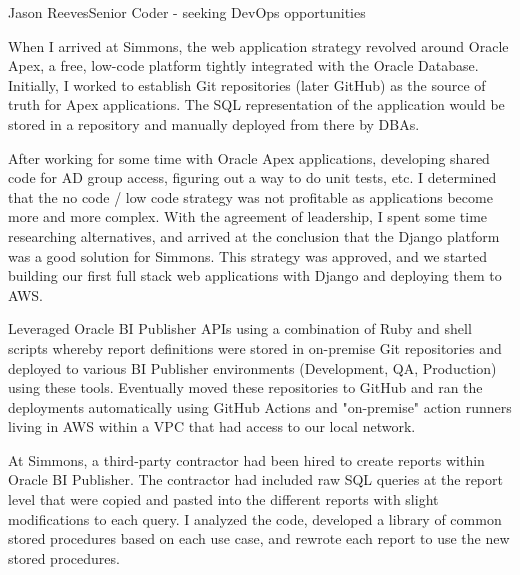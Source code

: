 \documentclass{article}
\begin{document}
\begin{cv}[avatar]{Jason Reeves}{Senior Coder - seeking DevOps opportunities}
\begin{cvevent}[2019]
    When I arrived at Simmons, the web application strategy revolved around Oracle Apex, a free, low-code platform tightly integrated with the Oracle Database.  Initially, I worked to establish Git repositories (later GitHub) as the source of truth for Apex applications.  The SQL representation of the application would be stored in a repository and manually deployed from there by DBAs.

    \vspace*{3mm}
    After working for some time with Oracle Apex applications, developing shared code for AD group access, figuring out a way to do unit tests, etc. I determined that the no code / low code strategy was not profitable as applications become more and more complex.  With the agreement of leadership, I spent some time researching alternatives, and arrived at the conclusion that the Django platform was a good solution for Simmons.  This strategy was approved, and we started building our first full stack web applications with Django and deploying them to AWS.
\end{cvevent}

\begin{cvevent}[2018-2020]
    Leveraged Oracle BI Publisher APIs using a combination of Ruby and shell scripts whereby report definitions were stored in on-premise Git repositories and deployed to various BI Publisher environments (Development, QA, Production) using these tools.  Eventually moved these repositories to GitHub and ran the deployments automatically using GitHub Actions and "on-premise" action runners living in AWS within a VPC that had access to our local network.  
    \vspace*{5mm}
\end{cvevent}

\begin{cvevent}[2018-2020]
    At Simmons, a third-party contractor had been hired to create reports within Oracle BI Publisher.  The contractor had included raw SQL queries at the report level that were copied and pasted into the different reports with slight modifications to each query.  I analyzed the code, developed a library of common stored procedures based on each use case, and rewrote each report to use the new stored procedures.


\end{cvevent}
\end{cv}
\end{document}
